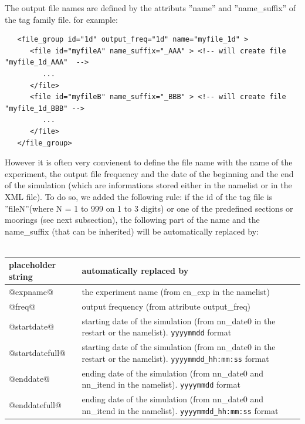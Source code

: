 The output file names are defined by the attributs ''name'' and ''name\_suffix'' of the tag family file. for example:
\vspace{-20pt}
\begin{alltt}  {{\scriptsize
\begin{verbatim}
   <file_group id="1d" output_freq="1d" name="myfile_1d" > 
      <file id="myfileA" name_suffix="_AAA" > <!-- will create file "myfile_1d_AAA"  -->
         ...
      </file>
      <file id="myfileB" name_suffix="_BBB" > <!-- will create file "myfile_1d_BBB" -->
         ...
      </file>
   </file_group>
\end{verbatim}
}}\end{alltt} 
However it is often very convienent to define the file name with the name of the experiment, the output file frequency and the date of the beginning and the end of the simulation (which are informations stored either in the namelist or in the XML file). To do so, we added the following rule: if the id of the tag file is ''fileN''(where N = 1 to 999 on 1 to 3 digits) or one of the predefined sections or moorings (see next subsection), the following part of the name and the name\_suffix (that can be inherited) will be automatically replaced by:\\
\\
\begin{tabular}{|p{4cm}|p{8cm}|}
   \hline
   \centering placeholder string & automatically  replaced by \\
   \hline
   \hline
   \centering @expname@ &
   the experiment name (from cn\_exp in the namelist) \\
   \hline
   \centering @freq@ &
   output frequency (from attribute output\_freq) \\
   \hline
   \centering @startdate@  &
   starting date of the simulation (from nn\_date0 in the restart or the namelist). \verb?yyyymmdd? format \\
   \hline
   \centering @startdatefull@  & 
   starting date of the simulation (from nn\_date0 in the restart or the namelist). \verb?yyyymmdd_hh:mm:ss? format \\
   \hline
   \centering @enddate@  &
   ending date of the simulation (from nn\_date0 and nn\_itend in the namelist). \verb?yyyymmdd? format \\
   \hline
   \centering @enddatefull@  & 
   ending date of the simulation (from nn\_date0 and nn\_itend in the namelist). \verb?yyyymmdd_hh:mm:ss? format \\
   \hline
\end{tabular}\\
\\

